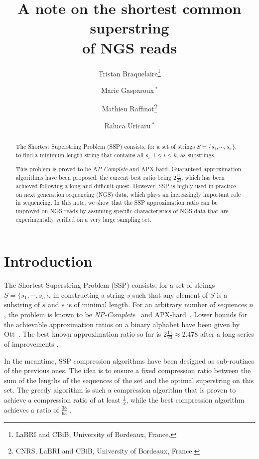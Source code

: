 \documentclass[10pt]{article}
\begin{document}
\title{A note on the shortest common superstring\\ of NGS reads}

\author{Tristan Braquelaire\thanks{LaBRI and CBiB, University of Bordeaux, France.} \and Marie Gasparoux$\,^*$ \and Mathieu Raffinot\thanks{CNRS, LaBRI and CBiB, University of Bordeaux, France.} \and Raluca Uricaru$\,^*$}

\maketitle


\begin{abstract}
The Shortest Superstring Problem (SSP) consists, for a set of strings
$S = \{s_1,\cdots,s_n\}$, to find a minimum length string that
contains all $s_i, 1\leq i \leq k$, as substrings.


 This problem is proved to be {\em NP-Complete} and APX-hard. Guaranteed
 approximation algorithms have been proposed, the current best ratio
 being $2\frac{11}{23}$, which has been achieved following a long and
 difficult quest. However, SSP is highly used in practice on next
 generation sequencing (NGS) data, which plays an increasingly important role in sequencing. In this note, we show that the SSP approximation ratio can be
 improved on NGS reads by assuming specific characteristics of NGS data
 that are experimentally verified on a very large sampling set.
\end{abstract}  


\section{Introduction}

The Shortest Superstring Problem (SSP) consists, for a set of strings
$S = \{s_1,\cdots,s_n\}$, in constructing a string $s$ such that any
element of $S$ is a substring of $s$ and $s$ is of minimal length.
For an arbitrary number of sequences $n$, the problem is known to be {\em NP-Complete}~\cite{GALLANT198050, Garey1990}
and APX-hard~\cite{Blum:1994}. Lower bounds for the achievable approximation ratios
on a binary alphabet have been given by
Ott~\cite{Ott1999}. The best known approximation ratio so far is $2
\frac{11}{23} \approx  2.478$ \cite{Mucha13} after a long series of improvements
\cite{l-tdstls-90, Blum:1994,KPS94,
  Armen1995,Armen199829,Breslauer1997340,
  Czumaj199774,Sweedyk:1999,TengY97, KaplanS05, PaluchEZ12}.

In the meantime, SSP compression algorithms have been designed as
sub-routines of the previous ones. The idea is to ensure a fixed
compression ratio between the sum of the lengths of the sequences of
the set and the optimal superstring on this set. The greedy algorithm
is such a compression algorithm that is proven to achieve a
compression ratio of at least $\frac{1}{2}$, while the best
compression algorithm achieves a ratio of $\frac{38}{63}$
\cite{KPS94}.
\end{document}
